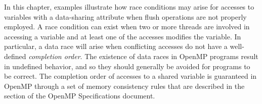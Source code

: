 In this chapter, examples illustrate how race conditions may arise for accesses
to variables with a  data-sharing attribute when flush operations
are not properly employed.  A race condition can exist when two or more threads
are involved in accessing a variable and at least one of the accesses modifies
the variable.  In particular, a data race will arise when conflicting accesses
do not have a well-defined \emph{completion order}.  The existence of data
races in OpenMP programs result in undefined behavior, and so they should
generally be avoided for programs to be correct.  The completion order of
accesses to a shared variable is guaranteed in OpenMP through a set of memory
consistency rules that are described in the 
section of the OpenMP Specifications document.




